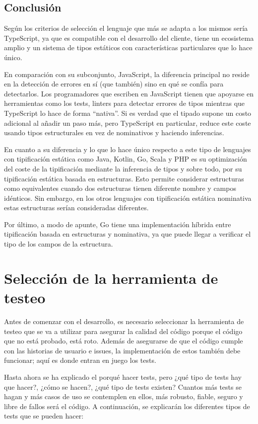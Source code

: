 \subsection{Conclusión}

Según los criterios de selección el lenguaje que más se adapta a los mismos sería TypeScript, ya que es compatible con el desarrollo del cliente, tiene un ecosistema amplio y un sistema de tipos estáticos con características particulares que lo hace único.

En comparación con su subconjunto, JavaScript, la diferencia principal no reside en la detección de errores en sí (que también) sino en qué se confía para detectarlos. Los programadores que escriben en JavaScript tienen que apoyarse en herramientas como los tests, linters para detectar errores de tipos mientras que TypeScript lo hace de forma ``nativa''. Si es verdad que el tipado supone un costo adicional al añadir un paso más, pero TypeScript en particular, reduce este coste usando tipos estructurales en vez de nominativos y haciendo inferencias.

En cuanto a su diferencia y lo que lo hace único respecto a este tipo de lenguajes con tipificación estática como Java, Kotlin, Go, Scala y PHP es su optimización del coste de la tipificación mediante la inferencia de tipos y sobre todo, por su tipificación estática basada en estructuras. Esto permite considerar estructuras como equivalentes cuando dos estructuras tienen diferente nombre y campos idénticos. Sin embargo, en los otros lenguajes con tipificación estática nominativa estas estructuras serían consideradas diferentes.

Por último, a modo de apunte, Go tiene una implementación híbrida entre tipificación basada en estructuras y nominativa, ya que puede llegar a verificar el tipo de los campos de la estructura.

\section{Selección de la herramienta de testeo}

Antes de comenzar con el desarrollo, es necesario seleccionar la herramienta de testeo que se va a utilizar para asegurar la calidad del código porque el código que no está probado, está roto. Además de asegurarse de que el código cumple con las historias de usuario e issues, la implementación de estos también debe funcionar; aquí es donde entran en juego los tests.

Hasta ahora se ha explicado el porqué hacer tests, pero ¿qué tipo de tests hay que hacer?, ¿cómo se hacen?, ¿qué tipo de tests existen? Cuantos más tests se hagan y más casos de uso se contemplen en ellos, más robusto, fiable, seguro y libre de fallos será el código. A continuación, se explicarán los diferentes tipos de tests que se pueden hacer:

